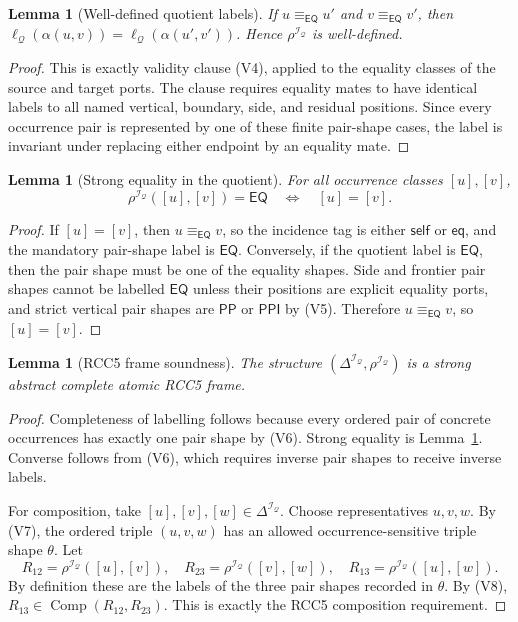 \documentclass[11pt]{article}
\newtheorem{lemma}[theorem]{Lemma}
\newcommand{\EQ}{\mathsf{EQ}}
\newcommand{\PP}{\mathsf{PP}}
\newcommand{\PPI}{\mathsf{PPI}}
\newcommand{\comp}{\operatorname{Comp}}
\newcommand{\I}{\mathcal I}
\newcommand{\Q}{\mathcal Q}
\newcommand{\eqc}{\equiv_{\EQ}}
\newcommand{\self}{\mathsf{self}}
\newcommand{\eqtag}{\mathsf{eq}}
\begin{document}
\begin{lemma}[Well-defined quotient labels]\label{lem:well-defined-labels}
If $u\eqc u'$ and $v\eqc v'$, then $\ell_\Q(\alpha(u,v))=\ell_\Q(\alpha(u',v'))$.  Hence $\rho^{\I_\Q}$ is well-defined.
\end{lemma}

\begin{proof}
This is exactly validity clause (V4), applied to the equality classes of the source and target ports.  The clause requires equality mates to have identical labels to all named vertical, boundary, side, and residual positions.  Since every occurrence pair is represented by one of these finite pair-shape cases, the label is invariant under replacing either endpoint by an equality mate.
\end{proof}

\begin{lemma}[Strong equality in the quotient]\label{lem:strong-eq-sound}
For all occurrence classes $[u],[v]$,
\[
  \rho^{\I_\Q}([u],[v])=\EQ
  \quad\Longleftrightarrow\quad
  [u]=[v].
\]
\end{lemma}

\begin{proof}
If $[u]=[v]$, then $u\eqc v$, so the incidence tag is either $\self$ or $\eqtag$, and the mandatory pair-shape label is $\EQ$.  Conversely, if the quotient label is $\EQ$, then the pair shape must be one of the equality shapes.  Side and frontier pair shapes cannot be labelled $\EQ$ unless their positions are explicit equality ports, and strict vertical pair shapes are $\PP$ or $\PPI$ by (V5).  Therefore $u\eqc v$, so $[u]=[v]$.
\end{proof}

\begin{lemma}[RCC5 frame soundness]\label{lem:frame-sound}
The structure $(\Delta^{\I_\Q},\rho^{\I_\Q})$ is a strong abstract complete atomic RCC5 frame.
\end{lemma}

\begin{proof}
Completeness of labelling follows because every ordered pair of concrete occurrences has exactly one pair shape by (V6).  Strong equality is Lemma~\ref{lem:strong-eq-sound}.  Converse follows from (V6), which requires inverse pair shapes to receive inverse labels.

For composition, take $[u],[v],[w]\in\Delta^{\I_\Q}$.  Choose representatives $u,v,w$.  By (V7), the ordered triple $(u,v,w)$ has an allowed occurrence-sensitive triple shape $\theta$.  Let
\[
  R_{12}=\rho^{\I_\Q}([u],[v]),\quad
  R_{23}=\rho^{\I_\Q}([v],[w]),\quad
  R_{13}=\rho^{\I_\Q}([u],[w]).
\]
By definition these are the labels of the three pair shapes recorded in $\theta$.  By (V8), $R_{13}\in\comp(R_{12},R_{23})$.  This is exactly the RCC5 composition requirement.
\end{proof}
\end{document}
